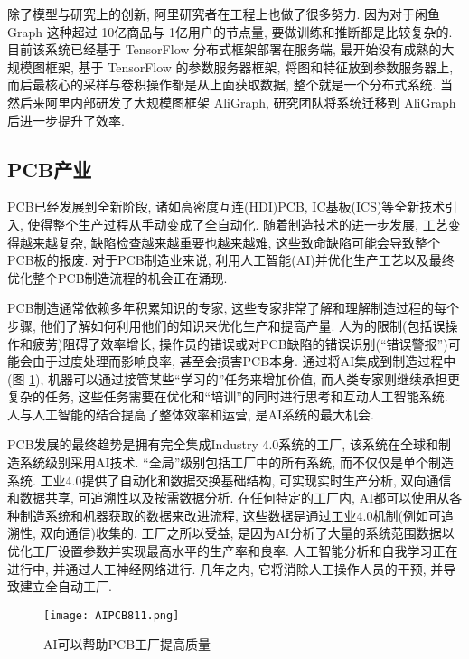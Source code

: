 除了模型与研究上的创新, 阿里研究者在工程上也做了很多努力. 因为对于闲鱼 Graph 这种超过 10亿商品与 1亿用户的节点量, 要做训练和推断都是比较复杂的.
目前该系统已经基于 TensorFlow 分布式框架部署在服务端, 最开始没有成熟的大规模图框架, 基于 TensorFlow 的参数服务器框架,  将图和特征放到参数服务器上, 而后最核心的采样与卷积操作都是从上面获取数据, 整个就是一个分布式系统.
当然后来阿里内部研发了大规模图框架 AliGraph, 研究团队将系统迁移到 AliGraph 后进一步提升了效率.
\subsection{PCB产业}
PCB已经发展到全新阶段, 诸如高密度互连(HDI)PCB, IC基板(ICS)等全新技术引入, 使得整个生产过程从手动变成了全自动化.
随着制造技术的进一步发展, 工艺变得越来越复杂, 缺陷检查越来越重要也越来越难, 这些致命缺陷可能会导致整个PCB板的报废. 对于PCB制造业来说, 利用人工智能(AI)并优化生产工艺以及最终优化整个PCB制造流程的机会正在涌现.

PCB制造通常依赖多年积累知识的专家, 这些专家非常了解和理解制造过程的每个步骤, 他们了解如何利用他们的知识来优化生产和提高产量.
人为的限制(包括误操作和疲劳)阻碍了效率增长, 操作员的错误或对PCB缺陷的错误识别(“错误警报”)可能会由于过度处理而影响良率, 甚至会损害PCB本身.
通过将AI集成到制造过程中(图 \ref{AIPCB811Fig4}), 机器可以通过接管某些“学习的”任务来增加价值, 而人类专家则继续承担更复杂的任务, 这些任务需要在优化和“培训”的同时进行思考和互动人工智能系统.
人与人工智能的结合提高了整体效率和运营, 是AI系统的最大机会.

PCB发展的最终趋势是拥有完全集成Industry 4.0系统的工厂, 该系统在全球和制造系统级别采用AI技术. “全局”级别包括工厂中的所有系统, 而不仅仅是单个制造系统.
工业4.0提供了自动化和数据交换基础结构, 可实现实时生产分析, 双向通信和数据共享, 可追溯性以及按需数据分析.
在任何特定的工厂内, AI都可以使用从各种制造系统和机器获取的数据来改进流程, 这些数据是通过工业4.0机制(例如可追溯性, 双向通信)收集的.
工厂之所以受益, 是因为AI分析了大量的系统范围数据以优化工厂设置参数并实现最高水平的生产率和良率.
人工智能分析和自我学习正在进行中, 并通过人工神经网络进行. 几年之内, 它将消除人工操作人员的干预, 并导致建立全自动工厂.
\begin{figure}[H]
	\centering
	\texttt{[image: AIPCB811.png]}
	\caption{AI可以帮助PCB工厂提高质量}
   \label{AIPCB811Fig4}
\end{figure}

